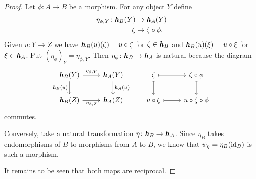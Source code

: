 \begin{proof}
    Let $\phi\colon A\to B$ be a morphism. For any object $Y$ define
    \begin{align*}
        \eta_{\phi,Y}\colon \textrm{\boldmath$\mathit h$}_B(Y)&\to\textrm{\boldmath$\mathit h$}_A(Y)\\
        \zeta&\mapsto\zeta\circ\phi.
    \end{align*}
    Given $u\colon Y\to Z$ we have $\textrm{\boldmath$\mathit h$}_B(u)(\zeta)=u\circ\zeta$ for $\zeta\in\textrm{\boldmath$\mathit h$}_B$ and $\textrm{\boldmath$\mathit h$}_B(u)(\xi)=u\circ\xi$ for $\xi\in\textrm{\boldmath$\mathit h$}_A$. Put $(\eta_\phi)_Y=\eta_{\phi,Y}$. Then $\eta_\phi\colon\textrm{\boldmath$\mathit h$}_B\to\textrm{\boldmath$\mathit h$}_A$ is natural because the diagram
    $$
        \begin{tikzcd}
            \yoneda_B(Y)
                    \arrow[r,"\eta_{\phi,Y}"]
                    \arrow[d,"\yoneda_B(u)"']
                &\yoneda_A(Y)
                    \arrow[d,"\yoneda_A(u)"]
                &\zeta
                    \arrow[r,mapsto]
                    \arrow[d,mapsto]
                &\zeta\circ\phi
                    \arrow[d,mapsto]\\
            \yoneda_B(Z)
                    \arrow[r,"\eta_{\phi,Z}"']
                &\yoneda_A(Z)&u\circ\zeta
                    \arrow[r,mapsto]
                &u\circ\zeta\circ\phi
        \end{tikzcd}
    $$
    commutes.
    
    Conversely, take a natural transformation $\eta\colon\textrm{\boldmath$\mathit h$}_B\to\textrm{\boldmath$\mathit h$}_A$. Since $\eta_B$ takes endomorphisms of $B$ to morphisms from $A$ to $B$, we know that $\psi_\eta=\eta_B(\text{\rm id}_B)$ is such a morphism.

    It remains to be seen that both maps are reciprocal.


\end{proof}
